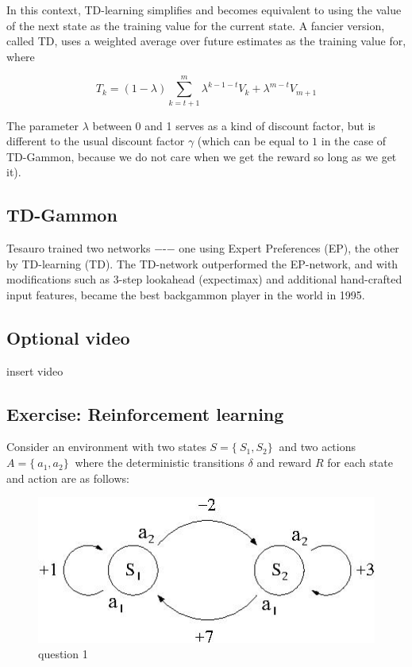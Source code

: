 \documentclass[11pt]{article}
\begin{document}
In this context, TD-learning simplifies and becomes equivalent to using the
value of the next state as the training value for the current state.
A fancier version, called TD, uses a weighted average over future estimates as
the training value for, where

\[T_k = (1 - \lambda) \sum_{k=t+1}^{m} \lambda^{k-1-t} V_k + \lambda^{m-t} V_{m+1}\]

The parameter $\lambda$ between 0 and 1 serves as a kind of discount factor,
but is different to the usual discount factor $\gamma$ (which can be equal to
$1$ in the case of TD-Gammon, because we do not care when we get the reward so
long as we get it).

\subsection{TD-Gammon}\label{subsec:td-gammon}
Tesauro trained two networks −-− one using Expert Preferences (EP), the other
by TD-learning (TD).
The TD-network outperformed the EP-network, and with modifications such as
3-step lookahead (expectimax) and additional hand-crafted input features,
became the best backgammon player in the world in 1995.

\subsection{Optional video}\label{subsec:optional-video8}
insert video

\subsection{Exercise: Reinforcement learning}\label{subsec:exercise:-reinforcement-learning}

Consider an environment with two states $S = \{\ S_1, S_2 \}\ $ and two actions
$A = \{\ a_1, a_2 \}\ $
where the deterministic transitions $\delta$ and reward $R$ for each state and
action are as follows:

\begin{figure}[H]
    \centering
    \includegraphics[width=\textwidth]{../out/images/question-1}
    \caption[question 1]{question 1}
    \label{fig:question 1}
\end{figure}
\end{document}
